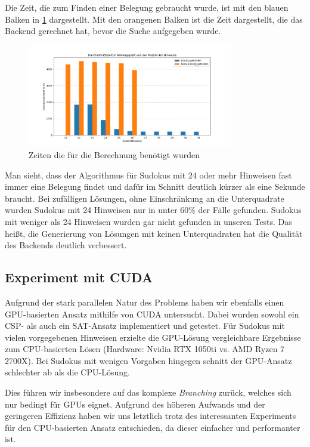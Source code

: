 Die Zeit, die zum Finden einer Belegung gebraucht wurde, ist mit den blauen Balken in \cref{fig:zeiten} dargestellt.
Mit den orangenen Balken ist die Zeit dargestellt, die das Backend gerechnet hat, bevor die Suche aufgegeben wurde.

\begin{figure}[H]
    \centering
    \includegraphics[width=0.8\textwidth]{Pictures/zeiten}
    \caption{Zeiten die für die Berechnung benötigt wurden}
    \label{fig:zeiten}
\end{figure}

Man sieht, dass der Algorithmus für Sudokus mit 24 oder mehr Hinweisen fast immer eine Belegung findet und dafür im Schnitt deutlich kürzer als eine Sekunde braucht.
Bei zufälligen Lösungen, ohne Einschränkung an die Unterquadrate wurden Sudokus mit 24 Hinweisen nur in unter 60\% der Fälle gefunden.
Sudokus mit weniger als 24 Hinweisen wurden gar nicht gefunden in unseren Tests.
Das heißt, die Generierung von Lösungen mit keinen Unterquadraten hat die Qualität des Backends deutlich verbessert.

\subsection{Experiment mit CUDA}

Aufgrund der stark parallelen Natur des Problems haben wir ebenfalls einen GPU-basierten Ansatz mithilfe von CUDA untersucht. Dabei wurden sowohl ein CSP- als auch ein SAT-Ansatz implementiert und getestet.
Für Sudokus mit vielen vorgegebenen Hinweisen erzielte die GPU-Lösung vergleichbare Ergebnisse zum CPU-basierten Lösen (Hardware: Nvidia RTX 1050ti vs. AMD Ryzen 7 2700X). Bei Sudokus mit wenigen Vorgaben hingegen schnitt der GPU-Ansatz schlechter ab als die CPU-Lösung.

Dies führen wir insbesondere auf das komplexe \emph{Branching} zurück, welches sich nur bedingt für GPUs eignet. Aufgrund des höheren Aufwands und der geringeren Effizienz haben wir uns letztlich trotz des interessanten Experiments für den CPU-basierten Ansatz entschieden, da dieser einfacher und performanter ist.